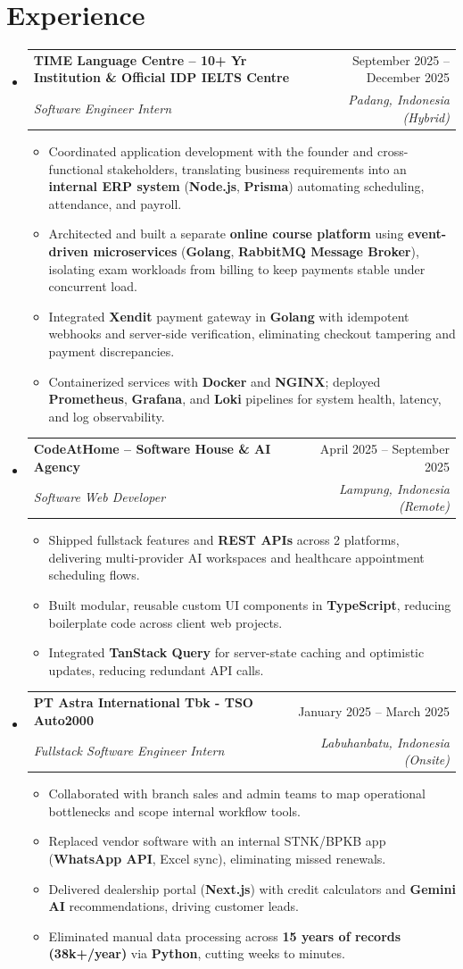 \documentclass[letterpaper,11pt]{article}
\makeatletter
\newcommand{\resumeItem}[1]{\item\small{#1}}
\newcommand{\resumeSubheading}[4]{
  \item
    \begin{tabular*}{\textwidth}[t]{l@{\extracolsep{\fill}}r}
      \textbf{#1} & #2 \\
      \textit{\small#3} & \textit{\small #4} \\
    \end{tabular*}\vspace{-1.8pt}
}
\newcommand{\resumeSubHeadingListStart}{\begin{itemize}[leftmargin=0in, label={}, itemsep=0.3pt, parsep=0pt, topsep=0.1pt]}
\newcommand{\resumeSubHeadingListEnd}{\end{itemize}\vspace{-2.5pt}}
\newcommand{\resumeItemListStart}{\begin{itemize}[leftmargin=15pt, label=\tiny$\bullet$, itemsep=0.35pt, parsep=0pt, topsep=0.15pt]}
\newcommand{\resumeItemListEnd}{\end{itemize}}
\makeatother
\begin{document}
\section{Experience}
  \resumeSubHeadingListStart
    \resumeSubheading
      {TIME Language Centre \textnormal{\small -- 10+ Yr Institution \& Official IDP IELTS Centre}}{September 2025 -- December 2025}
      {Software Engineer Intern}{Padang, Indonesia (Hybrid)}
      \resumeItemListStart
        \resumeItem{Coordinated application development with the founder and cross-functional stakeholders, translating business requirements into an \textbf{internal ERP system} (\textbf{Node.js}, \textbf{Prisma}) automating scheduling, attendance, and payroll.}
        \resumeItem{Architected and built a separate \textbf{online course platform} using \textbf{event-driven microservices} (\textbf{Golang}, \textbf{RabbitMQ Message Broker}), isolating exam workloads from billing to keep payments stable under concurrent load.}
        \resumeItem{Integrated \textbf{Xendit} payment gateway in \textbf{Golang} with idempotent webhooks and server-side verification, eliminating checkout tampering and payment discrepancies.}
        \resumeItem{Containerized services with \textbf{Docker} and \textbf{NGINX}; deployed \textbf{Prometheus}, \textbf{Grafana}, and \textbf{Loki} pipelines for system health, latency, and log observability.}
      \resumeItemListEnd 

    \resumeSubheading
      {CodeAtHome \textnormal{\small -- Software House \& AI Agency}}{April 2025 -- September 2025}
      {Software Web Developer}{Lampung, Indonesia (Remote)}
      \resumeItemListStart
        \resumeItem{Shipped fullstack features and \textbf{REST APIs} across 2 platforms, delivering multi-provider AI workspaces and healthcare appointment scheduling flows.}
        \resumeItem{Built modular, reusable custom UI components in \textbf{TypeScript}, reducing boilerplate code across client web projects.}
        \resumeItem{Integrated \textbf{TanStack Query} for server-state caching and optimistic updates, reducing redundant API calls.}
      \resumeItemListEnd

    \resumeSubheading
      {PT Astra International Tbk - TSO Auto2000}{January 2025 -- March 2025}
      {Fullstack Software Engineer Intern}{Labuhanbatu, Indonesia (Onsite)}
      \resumeItemListStart
        \resumeItem{Collaborated with branch sales and admin teams to map operational bottlenecks and scope internal workflow tools.}
        \resumeItem{Replaced vendor software with an internal STNK/BPKB app (\textbf{WhatsApp API}, Excel sync), eliminating missed renewals.}
        \resumeItem{Delivered dealership portal (\textbf{Next.js}) with credit calculators and \textbf{Gemini AI} recommendations, driving customer leads.}
        \resumeItem{Eliminated manual data processing across \textbf{15 years of records (38k+/year)} via \textbf{Python}, cutting weeks to minutes.}
      \resumeItemListEnd
  \resumeSubHeadingListEnd
\end{document}
